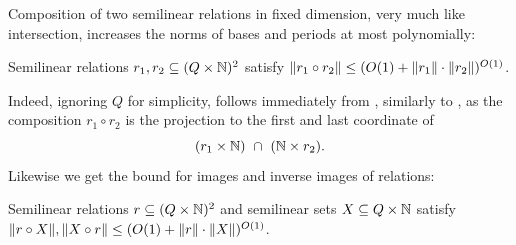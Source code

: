 
Composition of two semilinear relations in fixed dimension, 
very much like intersection,
increases the norms of bases and periods at most polynomially:

\begin{claim} \label{claim:circ}
Semilinear relations $r_1,r_2\subseteq (Q\times\mathbb{N})^2$ satisfy
$\lVert r_1 \circ r_2\rVert \leq (O(1)+\lVert r_1\rVert \cdot \lVert r_2\rVert)^{O(1)}$.
\end{claim}
Indeed, ignoring $Q$ for simplicity,  
follows immediately from \cite[Thm.~6]{taming}, similarly to 
, as
the composition $r_1 \circ r_2$ is the projection to the first and last coordinate
of 
\[
(r_1 \times \mathbb{N}) \ \cap \ (\mathbb{N}\times r_2).
\]
Likewise we get the bound for images and inverse images of relations:
\begin{claim} \label{claim:im}
Semilinear relations $r\subseteq (Q\times\mathbb{N})^2$ and semilinear sets
$X\subseteq Q\times\mathbb{N}$ satisfy
$\lVert r \circ X\rVert, \lVert X \circ r\rVert \leq 
(O(1)+\lVert r\rVert \cdot \lVert X\rVert)^{O(1)}$.
\end{claim}







